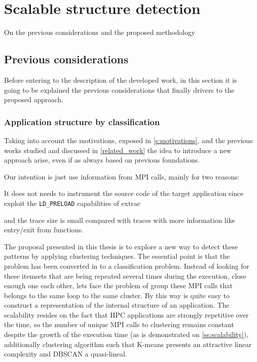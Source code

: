 
\chapter{Scalable structure detection}

On the previous considerations and the proposed methodology

\section{Previous considerations}

Before entering to the description of the developed work, in this section it is
going to be explained the previous considerations that finally drivers to the
proposed approach.

\subsection{Application structure by classification}

Taking into account the motivations, exposed in \ref{s:motivations}, and the
previous works studied and discussed in \ref{related_work} the idea to introduce
a new approach arise, even if as always based on previous foundations.  
 
Our intention is just use information from MPI calls, mainly for two 
reasons:
\begin{enumerate*}[label=\roman*)]
  \item It does not needs to instrument the source code of the target
    application since exploit the \texttt{LD\_PRELOAD} capabilities of extrae
  \item and the trace size is small compared with traces with more information
    like entry/exit from functions.
\end{enumerate*}

The proposal presented in this thesis is to explore a new way to detect these
patterns by applying clustering techniques. The essential point is that the 
problem has been converted in to a classification problem. 
Instead of looking for these itemsets that are being
repeated several times during the execution, close enough one each other, lets
face the problem of group these MPI calls that belongs to the same loop to the
same cluster. By this way is quite easy to construct a representation of the 
internal structure of an application. The scalability resides on the fact that
HPC applications are strongly repetitive over the time, so the number of unique
MPI calls to clustering remains constant despite the growth of the execution
time (as is demonstrated on \ref{ss:scalability}), additionally clustering
algorithm such that K-means presents an attractive linear complexity and DBSCAN a
quasi-lineal.

